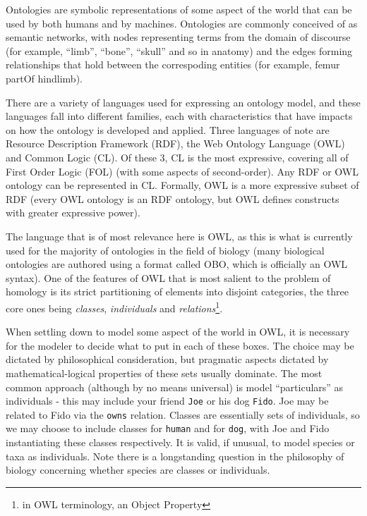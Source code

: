 Ontologies are symbolic representations of some aspect of the world that
can be used by both humans and by machines. Ontologies are commonly
conceived of as semantic networks\cite{}, with nodes representing terms
from the domain of discourse (for example, ``limb'', ``bone'', ``skull''
and so in anatomy) and the edges forming relationships that hold between
the correspoding entities (for example, femur partOf hindlimb).

There are a variety of languages used for expressing an ontology model,
and these languages fall into different families, each with
characteristics that have impacts on how the ontology is developed and
applied. Three languages of note are Resource Description Framework
(RDF), the Web Ontology Language (OWL) and Common Logic (CL). Of these
3, CL is the most expressive, covering all of First Order Logic (FOL)
(with some aspects of second-order). Any RDF or OWL ontology can be
represented in CL. Formally, OWL is a more expressive subset of RDF
(every OWL ontology is an RDF ontology, but OWL defines constructs with
greater expressive power).

The language that is of most relevance here is OWL, as this is what is
currently used for the majority of ontologies in the field of biology
(many biological ontologies are authored using a format called OBO,
which is officially an OWL syntax). One of the features of OWL that is
most salient to the problem of homology is its strict partitioning of
elements into disjoint categories, the three core ones being
\emph{classes}, \emph{individuals} and
\emph{relations}\footnote{in OWL terminology,
an Object Property}.

When settling down to model some aspect of the world in OWL, it is
necessary for the modeler to decide what to put in each of these boxes.
The choice may be dictated by philosophical consideration, but pragmatic
aspects dictated by mathematical-logical properties of these sets
usually dominate. The most common approach (although by no means
universal) is model ``particulars'' as individuals - this may include
your friend \texttt{Joe} or his dog \texttt{Fido}. Joe may be related to
Fido via the \texttt{owns} relation. Classes are essentially sets of
individuals, so we may choose to include classes for \texttt{human} and
for \texttt{dog}, with Joe and Fido instantiating these classes
respectively. It is valid, if unusual, to model species or taxa as
individuals. Note there is a longstanding question in the philosophy of
biology concerning whether species are classes or individuals.

